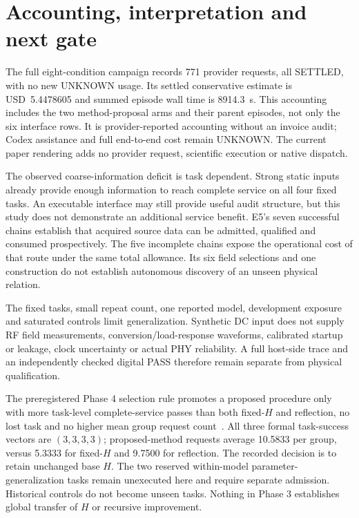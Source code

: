 \section{Accounting, interpretation and next gate}
The full eight-condition campaign records 771 provider requests, all SETTLED,
with no new UNKNOWN usage. Its settled conservative estimate is
USD~5.4478605 and summed episode wall time is 8914.3~s. This accounting includes
the two method-proposal arms and their parent episodes, not only the six
interface rows. It is provider-reported accounting without an invoice audit;
Codex assistance and full end-to-end cost remain UNKNOWN. The current paper
rendering adds no provider request, scientific execution or native dispatch.

The observed coarse-information deficit is task dependent. Strong static
inputs already provide enough information to reach complete service on all
four fixed tasks. An executable interface may still provide useful audit
structure, but this study does not demonstrate an additional service benefit.
E5's seven successful chains establish that acquired source data can be admitted,
qualified and consumed prospectively. The five incomplete chains expose the
operational cost of that route under the same total allowance. Its six field
selections and one construction do not establish autonomous discovery of an
unseen physical relation.

The fixed tasks, small repeat count, one reported model, development exposure
and saturated controls limit generalization. Synthetic DC input does not supply
RF field measurements, conversion/load-response waveforms, calibrated startup
or leakage, clock uncertainty or actual PHY reliability. A full host-side trace
and an independently checked digital PASS therefore remain separate from
physical qualification.

The preregistered Phase 4 selection rule promotes a proposed procedure only
with more task-level complete-service passes than both fixed-$H$ and reflection,
no lost task and no higher mean group request count~\cite{selection}.
All three formal task-success vectors are $(3,3,3,3)$; proposed-method requests
average 10.5833 per group, versus 5.3333 for fixed-$H$ and 9.7500 for reflection.
The recorded decision is to retain unchanged base $H$. The two reserved
within-model parameter-generalization tasks remain unexecuted here and require
separate admission. Historical controls do not become unseen tasks. Nothing
in Phase 3 establishes global transfer of $H$ or recursive improvement.

